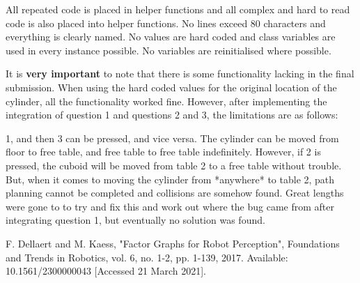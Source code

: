 \documentclass{homework}
\begin{document}
All repeated code is placed in helper functions and all complex and hard to read code is also placed into helper functions. No lines exceed 80 characters and everything is clearly named. No values are hard coded and class variables are used in every instance possible. No variables are reinitialised where possible.

It is \textbf{very important} to note that there is some functionality lacking in the final submission. When using the hard coded values for the original location of the cylinder, all the functionality worked fine. However, after implementing the integration of question 1 and questions 2 and 3, the limitations are as follows:

1, and then 3 can be pressed, and vice versa. The cylinder can be moved from floor to free table, and free table to free table indefinitely. However, if 2 is pressed, the cuboid will be moved from table 2 to a free table without trouble. But, when it comes to moving the cylinder from *anywhere* to table 2, path planning cannot be completed and collisions are somehow found. Great lengths were gone to to try and fix this and work out where the bug came from after integrating question 1, but eventually no solution was found. 


\newpage
\begin{thebibliography}{100}

 F. Dellaert and M. Kaess, "Factor Graphs for Robot Perception", Foundations and Trends in Robotics, vol. 6, no. 1-2, pp. 1-139, 2017. Available: 10.1561/2300000043 [Accessed 21 March 2021].

\end{thebibliography}
\end{document}
